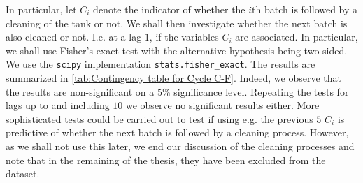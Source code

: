 \documentclass[../Thesis.tex]{subfiles}
\begin{document}


In particular, let $C_i$ denote the indicator of whether the $i$th batch is followed by a cleaning of the tank or not. We shall then investigate whether the next batch is also cleaned or not. I.e. at a lag $1$, if the variables $C_i$ are associated. In particular, we shall use Fisher's exact test with the alternative hypothesis being two-sided. We use the \texttt{scipy} implementation \texttt{stats.fisher_exact}. The results are summarized in \autoref{tab:Contingency table for Cycle C-F}. Indeed, we observe that the results are non-significant on a $5\%$ significance level. Repeating the tests for lags up to and including $10$ we observe no significant results either. More sophisticated tests could be carried out to test if using e.g. the previous $5$ $C_i$ is predictive of whether the next batch is followed by a cleaning process. However, as we shall not use this later, we end our discussion of the cleaning processes and note that in the remaining of the thesis, they have been excluded from the dataset.


\end{document}

